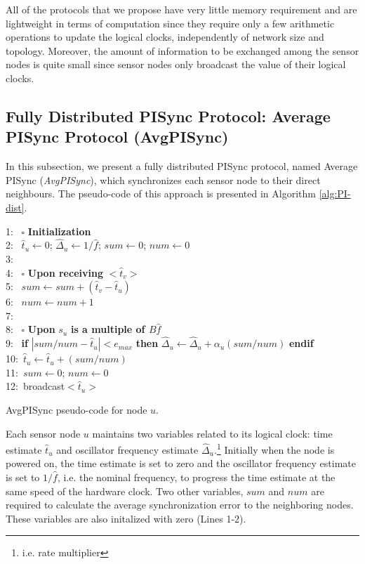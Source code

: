 \documentclass[english,a4paper,10pt,final]{article}
\numberwithin{equation}{section}
\numberwithin{figure}{section}
\begin{document}
All of the protocols that we propose have very little memory requirement and are lightweight in terms of computation since they require only a few arithmetic operations to update the logical clocks, independently of network size and topology. Moreover, the amount of information to be exchanged among the sensor nodes is quite small since sensor nodes only broadcast the value of their logical clocks.

\subsection{Fully Distributed PISync Protocol: Average PISync Protocol (AvgPISync)}

In this subsection, we present a fully distributed PISync protocol, named Average PISync (\textit{AvgPISync}), which synchronizes each sensor node to their direct neighbours. The pseudo-code of this approach is presented in Algorithm \ref{alg:PI-dist}.

\begin{algorithm}

\label{alg:PI-dist}
1:~ $\square$ \textbf{Initialization} \\
2:~ $\hat{t}_{u}\leftarrow0$; $\hat{\Delta}_{u}\leftarrow 1/\hat{f}$; $sum\leftarrow0$; $num\leftarrow0$\\
3:~ \\
4:~ $\square$ \textbf{Upon receiving} $<\hat{t}_{v}>$ \\
5:~ $sum\leftarrow sum+(\hat{t}_{v} - \hat{t}_{u})$ \\
6:~ $num\leftarrow num+1$ \\
7:~\\
8:~ $\square$ \textbf{Upon} $s_{u}$ \textbf{is a multiple of $B\hat{f}$} \\
9:~  \textbf{if}  $|sum/num - \hat{t}_{u}| < e_{max}$ \textbf{then} $\hat{\Delta}_{u}\leftarrow \hat{\Delta}_{u} + \alpha_u(sum/num)$ \textbf{endif} \\
10:~$\hat{t}_{u}\leftarrow \hat{t}_{u} + (sum/num)$ \\
11:~$sum\leftarrow0$; $num\leftarrow0$ \\
12:~broadcast$<\hat{t}_{u}>$ 

\caption{AvgPISync pseudo-code for node $u$.}
\end{algorithm}

Each sensor node $u$ maintains two variables related to its logical clock: time estimate $\hat{t}_{u}$ and  oscillator frequency estimate $\hat{\Delta}_{u}$.\footnote{i.e. rate multiplier} Initially when the node is powered on, the time estimate is set to zero and the oscillator frequency estimate is set to $1/\hat{f}$, i.e. the nominal frequency, to progress the time estimate at the same speed of the hardware clock. Two other variables, $sum$ and $num$ are required to calculate the average synchronization error to the neighboring nodes. These variables are also initalized with zero (Lines 1-2).
\end{document}
